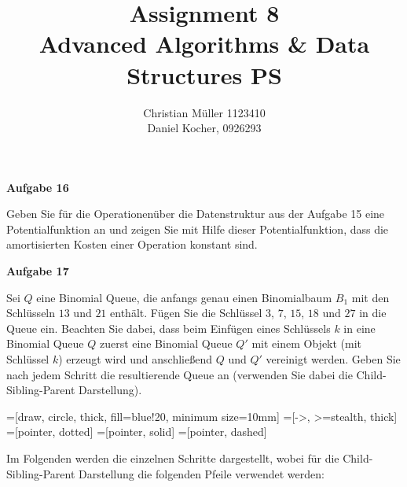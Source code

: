 \documentclass{article}
\begin{document}
\title{Assignment 8 \\ Advanced Algorithms \& Data Structures PS}%
\author{Christian Müller 1123410 \\ Daniel Kocher, 0926293}%
\maketitle

{\bfseries Aufgabe 16}%

Geben Sie f{\"u}r die Operationen{\"u}ber die Datenstruktur aus der Aufgabe 15
eine Potentialfunktion an und zeigen Sie mit Hilfe dieser Potentialfunktion, dass
die amortisierten Kosten einer Operation konstant sind.


{\bfseries Aufgabe 17}%

Sei $Q$ eine Binomial Queue, die anfangs genau einen Binomialbaum $B_1$ mit den
Schl{\"u}sseln $13$ und $21$ enth{\"a}lt. F{\"u}gen Sie die Schl{\"u}ssel $3$,
$7$, $15$, $18$ und $27$ in die Queue ein. Beachten Sie dabei, dass beim
Einf{\"u}gen eines Schl{\"u}ssels $k$ in eine Binomial Queue $Q$ zuerst eine
Binomial Queue $Q'$ mit einem Objekt (mit Schl{\"u}ssel $k$) erzeugt wird und
anschlie{\ss}end $Q$ und $Q'$ vereinigt werden. Geben Sie nach jedem Schritt die
resultierende Queue an (verwenden Sie dabei die Child-Sibling-Parent Darstellung).

=[draw, circle, thick, fill=blue!20, minimum size=10mm]
=[->, >=stealth, thick]
=[pointer, dotted]
=[pointer, solid]
=[pointer, dashed]

Im Folgenden werden die einzelnen Schritte dargestellt, wobei f{\"u}r die
Child-Sibling-Parent Darstellung die folgenden Pfeile verwendet werden:
\begin{figure}[H]
  \centering
\end{figure}
\end{document}
